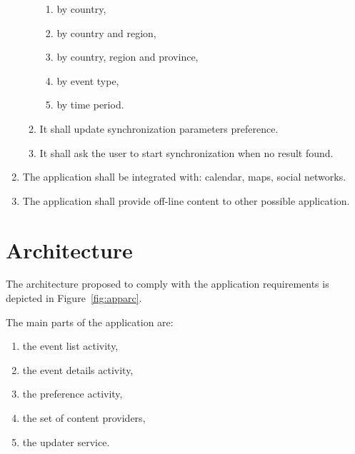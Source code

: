 \documentclass[12pt, twoside]{article}
\begin{document}
\begin{enumerate}
\begin{enumerate}
			\begin{enumerate}
				\item by country,
				\item	by country and region,
				\item	by country, region and province,
				\item by event type,
				\item by time period.
			\end{enumerate}
			\item It shall update synchronization parameters preference.
			\item	It shall ask the user to start synchronization when no result found.
    		\end{enumerate}
    	\item The application shall be integrated with: calendar, maps, social networks.
    	\item The application shall provide off-line content to other possible application.
\end{enumerate}

\section{Architecture}

The architecture proposed to comply with the application requirements
is depicted in Figure~\ref{fig:apparc}. 

The main parts of the application are:
\begin{enumerate}
	\item	the event list activity,
	\item	the event details activity,
	\item	the preference activity,
	\item	the set of content providers,
	\item	the updater service.
\end{enumerate}
\end{document}
